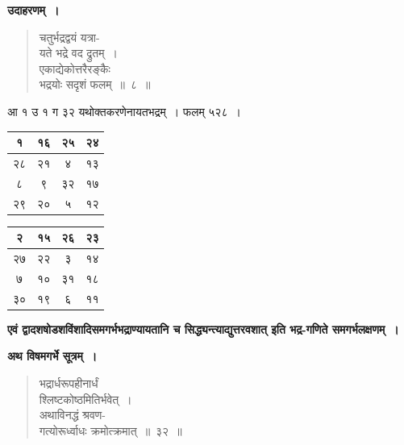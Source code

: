 \documentclass[11pt, openany]{book}
\begin{document}
\newpage

\textbf{उदाहरणम्~।}

\begin{quote}
{\ex चतुर्भद्रद्वयं यत्रा-\\
यते भद्रे वद द्रुतम्~।\\
एकाद्येकोत्तरैरङ्कैः\\
भद्रयोः सदृशं फलम्~॥~८~॥	}
\end{quote}

आ १ उ १ ग ३२ यथोक्तकरणेनायतभद्रम्~। फलम् ५२८~।

\begin{table}[h]
	\centering
\setlength{\extrarowheight}{2pt} \setlength{\tabcolsep}{2pt}
	\begin{tabular}{|c|c|c|c|}
		\hline
		१& १६ & २५ & २४\\
		\hline
		२८ & २१ & ४ & १३\\
		\hline
		८ & ९ & ३२ & १७\\
		\hline
		२९ & २० & ५ & १२\\
		\hline
	\end{tabular}\qquad
	\begin{tabular}{|c|c|c|c|}
		\hline
		२& १५ & २६ & २३\\
		\hline
		२७ & २२ & ३ & १४\\
		\hline
		७ & १० & ३१ & १८\\
		\hline
		३० & १९ & ६ & ११\\
		\hline
	\end{tabular}
\end{table}%

\textbf{एवं द्वादशषोडशविंशादिसमगर्भभद्राण्यायतानि च सिद्ध्यन्त्याद्युत्तरवशात् इति भद्र-गणिते समगर्भलक्षणम्~।}\\
\vspace{2mm}

\textbf{अथ विषमगर्भे सूत्रम्~।}

\begin{quote}
{\gk भद्रार्धरूपहीनार्धं\\
श्लिष्टकोष्ठमितिर्भवेत्~।\\
अथाविनद्धं श्रवण-\\
गत्योरूर्ध्वाधः क्रमोत्क्रमात्~॥~३२~॥}
\end{quote}

\newpage
\end{document}
